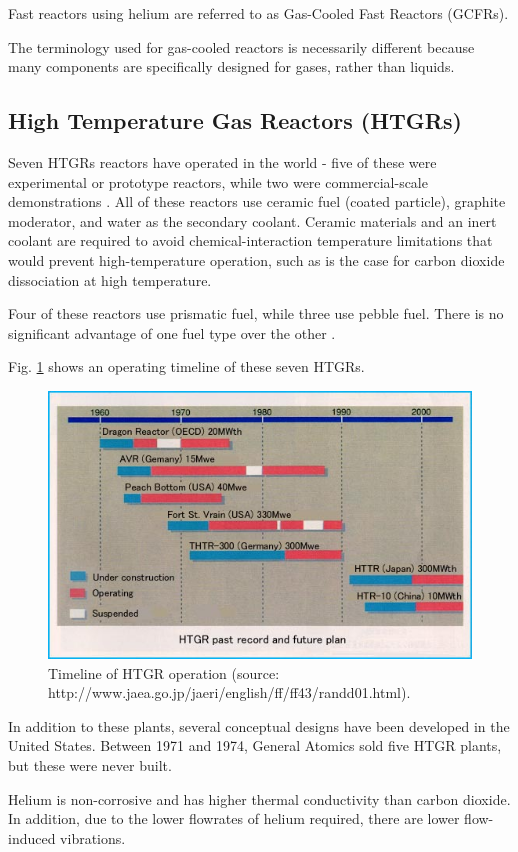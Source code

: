 \documentclass[10pt]{article}
\numberwithin{equation}{section} %
\begin{document}
Fast reactors using helium are referred to as Gas-Cooled Fast Reactors (GCFRs).

The terminology used for gas-cooled reactors is necessarily different because many components are specifically designed for gases, rather than liquids. 

\subsection{High Temperature Gas Reactors (HTGRs)}

Seven HTGRs reactors have operated in the world - five of these were experimental or prototype reactors, while two were commercial-scale demonstrations \cite{HTGRLessonsLearned, PNNLReport}. All of these reactors use ceramic fuel (coated particle), graphite moderator, and water as the secondary coolant. Ceramic materials and an inert coolant are required to avoid chemical-interaction temperature limitations that would prevent high-temperature operation, such as is the case for carbon dioxide dissociation at high temperature.

Four of these reactors use prismatic fuel, while three use pebble fuel. There is no significant advantage of one fuel type over the other \cite{PNNLReport}.

Fig. \ref{fig:HTGRTimeline} shows an operating timeline of these seven HTGRs.

\begin{figure}[H]
\centering
\includegraphics[width=0.6\linewidth]{figures/HTGRRecord.pdf}
\caption{Timeline of HTGR operation (source: http://www.jaea.go.jp/jaeri/english/ff/ff43/randd01.html).}
\label{fig:HTGRTimeline}
\end{figure}

In addition to these plants, several conceptual designs have been developed in the United States. Between 1971 and 1974, General Atomics sold five HTGR plants, but these were never built. 



 
Helium is non-corrosive and has higher thermal conductivity than carbon dioxide. In addition, due to the lower flowrates of helium required, there are lower flow-induced vibrations.
\end{document}
